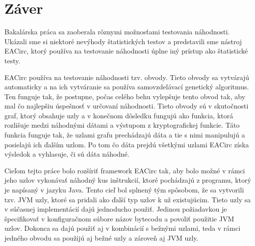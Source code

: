 \chapter*{Záver}
\label{chap:conclusion}

Bakalárska práca sa zaoberala rôznymi možnosťami testovania náhodnosti. Ukázali sme si niektoré nevýhody štatistických testov a predstavili sme nástroj EACirc, ktorý používa na testovanie náhodnosti úplne iný prístup ako štatistické testy. 

EACirc používa na testovanie náhodnosti tzv. obvody. Tieto obvody sa vytvárajú automaticky a na ich vytváranie sa používa samovzdelávací genetický algoritmus. Ten funguje tak, že postupne, počas celého behu vylepšuje tento obvod tak, aby mal čo najlepšiu úspešnosť v určovaní náhodnosti. Tieto obvody sú v skutočnosti graf, ktorý obsahuje uzly a v konečnom dôsledku fungujú ako funkcia, ktorá rozlišuje medzi náhodnými dátami a výstupom z kryptografickej funkcie. Táto funkcia funguje tak, že uzlami grafu prechádzajú dáta a tie s nimi manipulujú a posielajú ich ďalším uzlom. Po tom čo dáta prejdú všetkými uzlami EACirc získa výsledok a vyhlasuje, či sú dáta náhodné.

Cieľom tejto práce bolo rozšíriť framework EACirc tak, aby bolo možné v rámci jeho uzlov vykonávať náhodný kus inštrukcií, ktoré pochádzajú z programu, ktorý je napísaný v jazyku Java. Tento cieľ bol splnený tým spôsobom, že sa vytvorili tzv. JVM uzly, ktoré sa pridali ako ďalší typ uzlov k už existujúcim. Tieto uzly sa v súčasnej implementácií dajú jednoducho použiť. Jedinou požiadavkou je špecifikovať v konfiguračnom súbore názov bytecodu a povoliť použitie JVM uzlov. Dokonca sa dajú použiť aj v kombinácií s bežnými uzlami, teda v rámci jedného obvodu sa použijú aj bežné uzly a zároveň aj JVM uzly.

